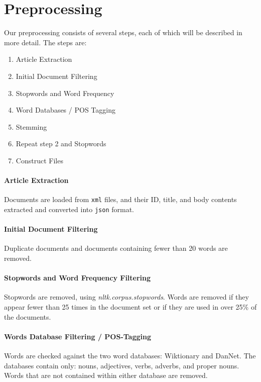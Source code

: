 \section{Preprocessing}\label{sec:prepro} 

Our preprocessing consists of several steps, each of which will be described in more detail.
The steps are:
\begin{enumerate}
	\item Article Extraction
	\item Initial Document Filtering
	\item Stopwords and Word Frequency
	\item Word Databases / POS Tagging
	\item Stemming
	\item Repeat step 2 and Stopwords
	\item Construct Files
\end{enumerate}

\paragraph{Article Extraction}
Documents are loaded from \texttt{xml} files, and their ID, title, and body contents extracted and converted into \texttt{json} format.

\paragraph{Initial Document Filtering}
Duplicate documents and documents containing fewer than 20 words are removed.

\paragraph{Stopwords and Word Frequency Filtering}
Stopwords are removed, using \emph{nltk.corpus.stopwords}. 
Words are removed if they appear fewer than 25 times in the document set or if they are used in over 25\% of the documents.

\paragraph{Words Database Filtering / POS-Tagging}
Words are checked against the two word databases: Wiktionary and DanNet. 
The databases contain only: nouns, adjectives, verbs, adverbs, and proper nouns. 
Words that are not contained within either database are removed.


